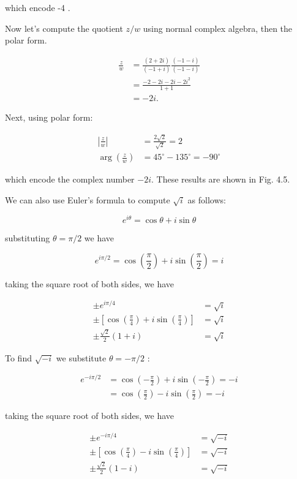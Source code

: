 \documentclass[10pt]{article}
\begin{document}
which encode -4 .

Now let's compute the quotient $z / w$ using normal complex algebra, then the polar form.

$$
\begin{aligned}
\frac{z}{w} & =\frac{(2+2 i)}{(-1+i)} \frac{(-1-i)}{(-1-i)} \\
& =\frac{-2-2 i-2 i-2 i^{2}}{1+1} \\
& =-2 i .
\end{aligned}
$$

Next, using polar form:

$$
\begin{aligned}
\left|\frac{z}{w}\right| & =\frac{2 \sqrt{2}}{\sqrt{2}}=2 \\
\arg \left(\frac{z}{w}\right) & =45^{\circ}-135^{\circ}=-90^{\circ}
\end{aligned}
$$

which encode the complex number $-2 i$. These results are shown in Fig. 4.5.

We can also use Euler's formula to compute $\sqrt{i}$ as follows:

$$
e^{i \theta}=\cos \theta+i \sin \theta
$$

substituting $\theta=\pi / 2$ we have

$$
e^{i \pi / 2}=\cos \left(\frac{\pi}{2}\right)+i \sin \left(\frac{\pi}{2}\right)=i
$$

taking the square root of both sides, we have

$$
\begin{aligned}
\pm e^{i \pi / 4} & =\sqrt{i} \\
\pm\left[\cos \left(\frac{\pi}{4}\right)+i \sin \left(\frac{\pi}{4}\right)\right] & =\sqrt{i} \\
\pm \frac{\sqrt{2}}{2}(1+i) & =\sqrt{i}
\end{aligned}
$$

To find $\sqrt{-i}$ we substitute $\theta=-\pi / 2$ :

$$
\begin{aligned}
e^{-i \pi / 2} & =\cos \left(-\frac{\pi}{2}\right)+i \sin \left(-\frac{\pi}{2}\right)=-i \\
& =\cos \left(\frac{\pi}{2}\right)-i \sin \left(\frac{\pi}{2}\right)=-i
\end{aligned}
$$

taking the square root of both sides, we have

$$
\begin{aligned}
\pm e^{-i \pi / 4} & =\sqrt{-i} \\
\pm\left[\cos \left(\frac{\pi}{4}\right)-i \sin \left(\frac{\pi}{4}\right)\right] & =\sqrt{-i} \\
\pm \frac{\sqrt{2}}{2}(1-i) & =\sqrt{-i}
\end{aligned}
$$
\end{document}
